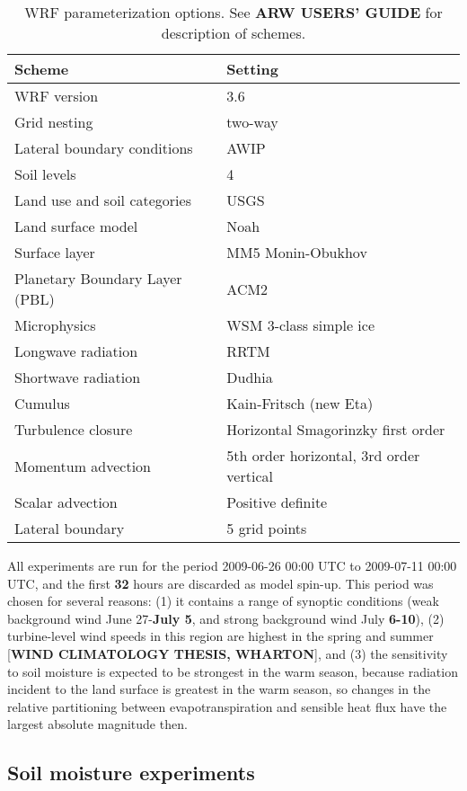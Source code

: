 \begin{table}
\begin{tabular}{l l}
\hline
Scheme & Setting \\ \hline
WRF version & 3.6 \\
Grid nesting & two-way \\
Lateral boundary conditions & AWIP \\
Soil levels & 4 \\
Land use and soil categories & USGS \\
Land surface model & Noah \\
Surface layer & MM5 Monin-Obukhov \\
Planetary Boundary Layer (PBL) & ACM2 \\
Microphysics & WSM 3-class simple ice \\
Longwave radiation & RRTM \\
Shortwave radiation & Dudhia \\
Cumulus & Kain-Fritsch (new Eta) \\
Turbulence closure & Horizontal Smagorinzky first order \\
Momentum advection & 5th order horizontal, 3rd order vertical \\
Scalar advection & Positive definite \\
Lateral boundary & 5 grid points \\
\hline
\end{tabular}
\caption{WRF parameterization options.  See \textbf{ARW USERS' GUIDE} for description of schemes.}
\label{table:windSol_paramschemes}
\end{table}

All experiments are run for the period 2009-06-26 00:00 UTC to 2009-07-11 00:00 UTC, and the first \textbf{32} hours are discarded as model spin-up.  This period was chosen for several reasons: (1) it contains a range of synoptic conditions (weak background wind June 27-\textbf{July 5}, and strong background wind July \textbf{6-10}), (2) turbine-level wind speeds in this region are highest in the spring and summer [\textbf{WIND CLIMATOLOGY THESIS, WHARTON}], and (3) the sensitivity to soil moisture is expected to be strongest in the warm season, because radiation incident to the land surface is greatest in the warm season, so changes in the relative partitioning between evapotranspiration and sensible heat flux have the largest absolute magnitude then.

\subsection{Soil moisture experiments}

